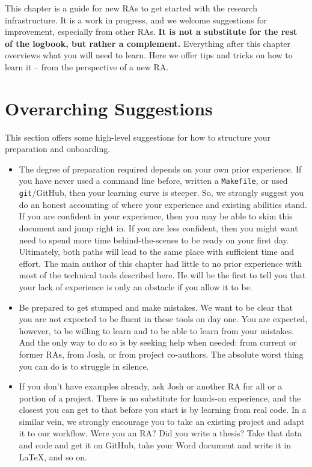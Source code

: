 This chapter is a guide for new RAs to get started with the research infrastructure. 
It is a work in progress, and we welcome suggestions for improvement, 
especially from other RAs.
\textbf{It is not a substitute for the rest of the logbook, but rather a complement.}
Everything after this chapter overviews what you will need to learn.
Here we offer tips and tricks on how to learn it  – from the perspective of a new RA.

\section{Overarching Suggestions}

This section offers some high-level suggestions for 
how to structure your preparation and onboarding.
\begin{itemize}

\item The degree of preparation required depends on your own prior experience. 
If you have never used a command line before, written a \texttt{Makefile}, or used \texttt{git}/GitHub, 
then your learning curve is steeper.
So, we strongly suggest you do an honest accounting 
of where your experience and existing abilities stand. 
If you are confident in your experience, 
then you may be able to skim this document and jump right in.
If you are less confident, 
then you might want need to spend more time behind-the-scenes to be ready on your first day. 
Ultimately, both paths will lead to the same place with sufficient time and effort. 
The main author of this chapter had little to no prior experience
 with most of the technical tools described here.
He will be the first to tell you that your lack of experience 
is only an obstacle if you allow it to be.

\item Be prepared to get stumped and make mistakes. 
We want to be clear that you are not expected to be fluent in these tools on day one.
You are expected, however, to be willing to learn and to be able to learn from your mistakes.
And the only way to do so is by seeking help when needed: 
from current or former RAs, from Josh, or from project co-authors.
The absolute worst thing you can do is to struggle in silence.

\item If you don't have examples already, 
ask Josh or another RA for all or a portion of a project. 
There is no substitute for hands-on experience, 
and the closest you can get to that before you start is by learning from real code. 
In a similar vein, we strongly encourage you to take an existing project 
and adapt it to our workflow. 
Were you an RA? Did you write a thesis? 
Take that data and code and get it on GitHub, 
take your Word document and write it in \LaTeX, and so on.



\end{itemize}
